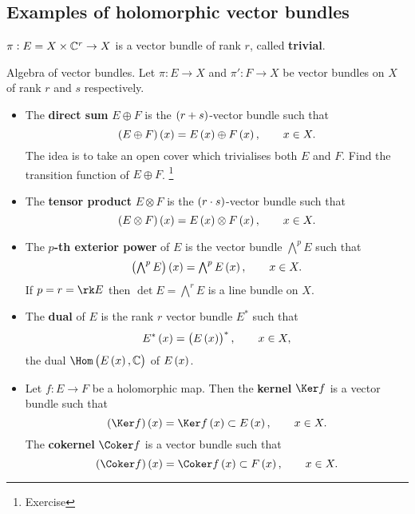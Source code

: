 \pagebreak

\subsection{Examples of holomorphic vector bundles}

\begin{example}
$ \pi : E = X \times \mathbb{C}^r \to X $ is a vector bundle of rank $ r $, called \textbf{trivial}.
\end{example}

\begin{example}
Algebra of vector bundles. Let $ \pi : E \to X $ and $ \pi' : F \to X $ be vector bundles on $ X $ of rank $ r $ and $ s $ respectively.
\begin{itemize}
\item The \textbf{direct sum} $ E \oplus F $ is the $ \br{r + s} $-vector bundle such that
$$ \br{E \oplus F}\br{x} = E\br{x} \oplus F\br{x}, \qquad x \in X. $$
The idea is to take an open cover which trivialises both $ E $ and $ F $. Find the transition function of $ E \oplus F $. \footnote{Exercise}
\item The \textbf{tensor product} $ E \otimes F $ is the $ \br{r \cdot s} $-vector bundle such that
$$ \br{E \otimes F}\br{x} = E\br{x} \otimes F\br{x}, \qquad x \in X. $$
\item The \textbf{$ p $-th exterior power} of $ E $ is the vector bundle $ \bigwedge^pE $ such that
$$ \br{\textstyle\bigwedge^pE}\br{x} = \textstyle\bigwedge^pE\br{x}, \qquad x \in X. $$
If $ p = r = \rk E $ then $ \det E = \bigwedge^rE $ is a line bundle on $ X $.
\item The \textbf{dual} of $ E $ is the rank $ r $ vector bundle $ E^* $ such that
$$ E^*\br{x} = \br{E\br{x}}^*, \qquad x \in X, $$
the dual $ \Hom\br{E\br{x}, \CC} $ of $ E\br{x} $.
\item Let $ f : E \to F $ be a holomorphic map. Then the \textbf{kernel} $ \Ker f $ is a vector bundle such that
$$ \br{\Ker f}\br{x} = \Ker f\br{x} \subset E\br{x}, \qquad x \in X. $$
The \textbf{cokernel} $ \Coker f $ is a vector bundle such that
$$ \br{\Coker f}\br{x} = \Coker f\br{x} \subset F\br{x}, \qquad x \in X. $$
\end{itemize}
\end{example}


